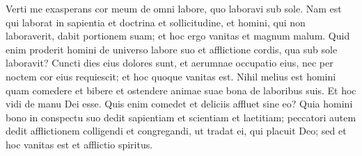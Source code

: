 \begin{biblechapter}
\begin{biblechapter}
\verse Verti me exasperans cor meum de omni labore, quo laboravi sub sole. 
 \verse Nam est qui laborat in sapientia et doctrina et sollicitudine, et homini, qui non laboraverit, dabit portionem suam; et hoc ergo vanitas et magnum malum.
 \verse Quid enim proderit homini de universo labore suo et afflictione cordis, qua sub sole laboravit? 
\verse Cuncti dies eius dolores sunt, et aerumnae occupatio eius, nec per noctem cor eius requiescit; et hoc quoque vanitas est. 
\verse Nihil melius est homini quam comedere et bibere et ostendere animae suae bona de laboribus suis. Et hoc vidi de manu Dei esse. 
\verse Quis enim comedet et deliciis affluet sine eo?
 \verse Quia homini bono in conspectu suo dedit sapientiam et scientiam et laetitiam; peccatori autem dedit afflictionem colligendi et congregandi, ut tradat ei, qui placuit Deo; sed et hoc vanitas est et afflictio spiritus.
 

\end{biblechapter}
\end{biblechapter}
